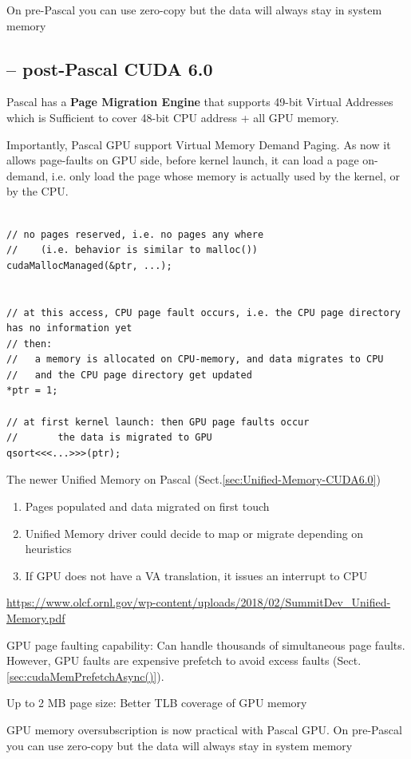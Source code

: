 On pre-Pascal you can use zero-copy but the data will always stay in system memory

\subsection{-- post-Pascal CUDA 6.0}

Pascal has a {\bf Page Migration Engine} that supports 49-bit Virtual Addresses
which is Sufficient to cover 48-bit CPU address + all GPU memory.

Importantly, Pascal GPU support Virtual Memory Demand Paging.
As now it allows page-faults on GPU side, before kernel launch, it can load a
page on-demand, i.e. only load the page whose memory is actually used by the
kernel, or by the CPU.
\begin{verbatim}

// no pages reserved, i.e. no pages any where
//    (i.e. behavior is similar to malloc())
cudaMallocManaged(&ptr, ...); 


// at this access, CPU page fault occurs, i.e. the CPU page directory has no information yet
// then: 
//   a memory is allocated on CPU-memory, and data migrates to CPU
//   and the CPU page directory get updated
*ptr = 1; 

// at first kernel launch: then GPU page faults occur
//       the data is migrated to GPU
qsort<<<...>>>(ptr);
\end{verbatim}

The newer Unified Memory on Pascal (Sect.\ref{sec:Unified-Memory-CUDA6.0})
\begin{enumerate}
  \item   Pages populated and data migrated on first touch
  
  \item Unified Memory driver could decide to map or migrate depending on heuristics
  
  \item If GPU does not have a VA translation, it issues an interrupt to CPU
\end{enumerate}
\url{https://www.olcf.ornl.gov/wp-content/uploads/2018/02/SummitDev_Unified-Memory.pdf}

GPU page faulting capability: Can handle thousands of simultaneous page faults.
However, GPU faults are expensive prefetch to avoid excess faults (Sect.\ref{sec:cudaMemPrefetchAsync()}).

Up to 2 MB page size: Better TLB coverage of GPU memory

GPU memory oversubscription is now practical with Pascal GPU. 
On pre-Pascal you can use zero-copy but the data will always stay in system memory


